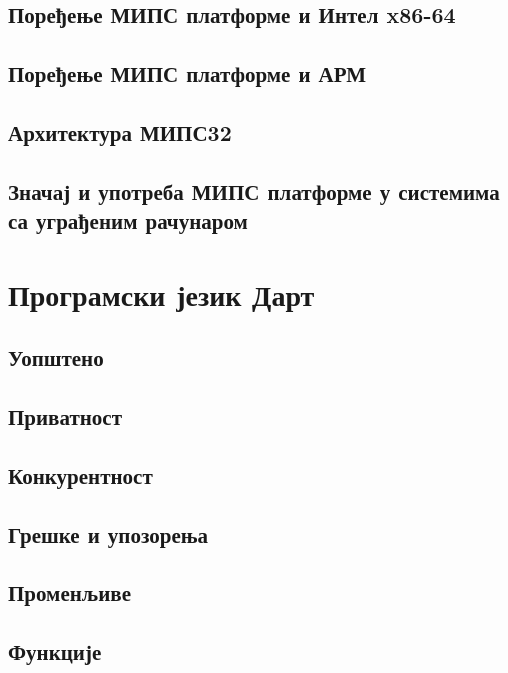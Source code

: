 \documentclass[12pt,oneside]{memoir}
\begin{document}
\section{Поређење МИПС платформе и Интел x86-64}

\section{Поређење МИПС платформе и АРМ}

\section{Архитектура МИПС32}

\section{Значај и употреба МИПС платформе у системима са уграђеним рачунаром}

\chapter{Програмски језик Дарт}
\label{chp:dart}

\section{Уопштено}

\section{Приватност}

\section{Конкурентност}

\section{Грешке и упозорења}

\section{Променљиве}

\section{Функције}
\end{document}

